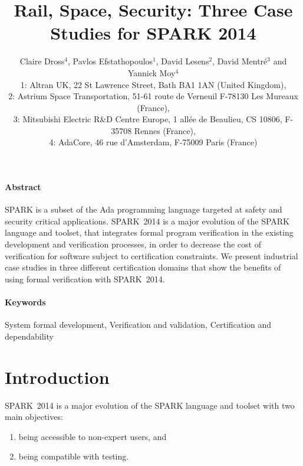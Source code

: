 \documentclass[10pt,a4paper,twocolumn]{article}
\newcommand{\newspark}{SPARK~2014\xspace}
\begin{document}
\title{Rail, Space, Security: Three Case Studies for SPARK 2014}

\author{%
\large Claire Dross$^4$, Pavlos Efstathopoulos$^1$, David Lesens$^2$, David Mentré$^3$ and Yannick Moy$^4$\\
\normalsize 1: Altran UK, 22 St Lawrence Street, Bath BA1 1AN (United Kingdom),\\
\normalsize 2: Astrium Space Transportation, 51-61 route de Verneuil F-78130 Les Mureaux (France),\\
\normalsize 3: Mitsubishi Electric R\&D Centre Europe, 1 allée de
Beaulieu, CS 10806, F-35708 Rennes (France),\\
\normalsize 4: AdaCore, 46 rue d'Amsterdam, F-75009 Paris (France)}

\date{}

\maketitle

\paragraph{Abstract}
SPARK is a subset of the Ada programming language targeted at safety
and security critical applications. \newspark is a major evolution of
the SPARK language and toolset, that integrates formal program
verification in the existing development and verification processes,
in order to decrease the cost of verification for software subject to
certification constraints. We present industrial case studies in three
different certification domains that show the benefits of using formal
verification with \newspark.

\paragraph{Keywords}
System formal development, Verification and validation,
Certification and dependability

\section{Introduction}

\newspark is a major evolution of the SPARK language and toolset with two main
objectives:
%
\begin{enumerate}
\item being accessible to non-expert users, and
\item being compatible with testing.
\end{enumerate}
\end{document}
